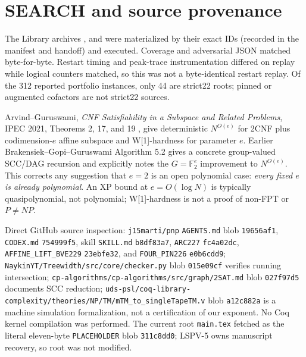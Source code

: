 \documentclass[11pt]{article}
\newcommand{\GF}{\mathbb F_2}
\begin{document}
\section{SEARCH and source provenance}
The Library archives ,  and  were materialized by their exact IDs (recorded in the manifest and handoff) and executed. Coverage and adversarial JSON matched byte-for-byte. Restart timing and peak-trace instrumentation differed on replay while logical counters matched, so this was not a byte-identical restart replay. Of the 312 reported portfolio instances, only 44 are strict22 roots; pinned or augmented cofactors are not strict22 sources.

Arvind--Guruswami, \emph{CNF Satisfiability in a Subspace and Related Problems}, IPEC 2021, Theorems 2, 17, and 19 \cite{AG21}, give deterministic $N^{O(e)}$ for 2CNF plus codimension-$e$ affine subspace and W[1]-hardness for parameter $e$. Earlier Brakensiek--Gopi--Guruswami Algorithm 5.2 \cite{BGG19} gives a concrete group-valued SCC/DAG recursion and explicitly notes the $G=\GF^e$ improvement to $N^{O(e)}$. This corrects any suggestion that $e=2$ is an open polynomial case: \emph{every fixed $e$ is already polynomial}. An XP bound at $e=O(\log N)$ is typically quasipolynomial, not polynomial; W[1]-hardness is not a proof of non-FPT or $P\ne NP$.

Direct GitHub source inspection: \texttt{j15marti/pnp} \texttt{AGENTS.md} blob \texttt{19656af1}, \texttt{CODEX.md} \texttt{754999f5}, skill \texttt{SKILL.md} \texttt{b8df83a7}, \texttt{ARC227} \texttt{fc4a02dc}, \texttt{AFFINE\_LIFT\_BVE229} \texttt{23ebfe32}, and \texttt{FOUR\_PIN226} \texttt{e0b6cdd9}; \texttt{NaykinYT/Treewidth/src/core/checker.py} blob \texttt{015e09cf} verifies running intersection; \texttt{cp-algorithms/cp-algorithms/src/graph/2SAT.md} blob \texttt{027f97d5} documents SCC reduction; \texttt{uds-psl/coq-library-complexity/theories/NP/TM/mTM\_to\_singleTapeTM.v} blob \texttt{a12c882a} is a machine simulation formalization, not a certification of our exponent. No Coq kernel compilation was performed. The current root \texttt{main.tex} fetched as the literal eleven-byte \texttt{PLACEHOLDER} blob \texttt{311c8dd0}; LSPV-5 owns manuscript recovery, so root was not modified.
\end{document}
